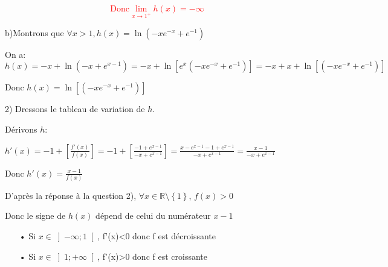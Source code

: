 \documentclass[12pt]{article}
\begin{document}
\textcolor{red}{\[\text{Donc}\lim_{x \to 1^{+}}h(x)=-\infty\]}

b)Montrons que $\forall x>1, h(x)=\ln(-xe^{-x}+e^{-1}) $ 

On a: $h(x)=-x+\ln(-x+e^{x-1})=-x+\ln\left[e^{x}(-xe^{-x}+e^{-1})\right]=-x+x+\ln\left[(-xe^{-x}+e^{-1})\right]$

Donc $h(x)=\ln\left[(-xe^{-x}+e^{-1})\right]$




2) Dressons le tableau de variation de  $h$. 

Dérivons $h$:

$h'(x)=-1+\left[\frac{f'(x)}{f(x)}\right]=-1+\left[\frac{-1+e^{x-1}}{-x+e^{x-1}}\right]=\frac{x-e^{x-1}-1+e^{x-1}}{-x+e^{x-1}}=\frac{x-1}{-x+e^{x-1}}$

Donc $h'(x)=\frac{x-1}{f(x)}$

D'après la réponse à la question 2), $\forall x\in \mathbb{R}\setminus\left\lbrace 1\right\rbrace $, $f(x)>0$

Donc le signe de $h(x)$ dépend de celui du numérateur $x-1$
\begin{itemize}
\item[•] Si $x\in \left]-\infty; 1\right[$, f'(x)<0 donc f est décroissante
\item[•] Si $x\in \left]1; +\infty\right[$, f'(x)>0 donc f est croissante
\end{itemize}
\end{document}
